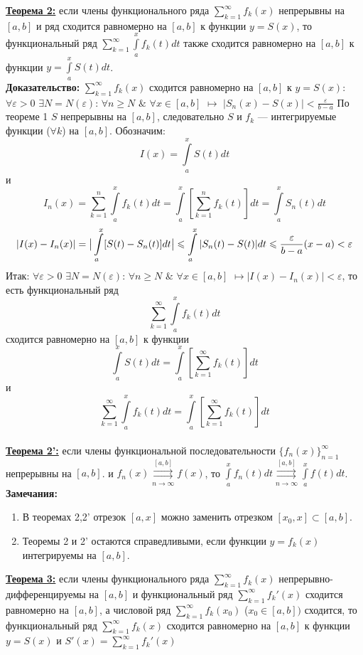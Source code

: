 \documentclass[a4paper,12pt]{article} %
\renewcommand {\geq}{\geqslant}
\renewcommand {\leq}{\leqslant}
\begin{document}
\underline{\textbf{Теорема 2:}} если члены функционального ряда $\sum\limits_{k = 1}^{\infty}  f_k(x)$   непрерывны на $[a,b]$ и ряд сходится равномерно на $[a,b]$ к функции $y = S(x)$, то функциональный ряд $\sum\limits_{k = 1}^{\infty}  \int\limits_{a}^{x}f_k(t)dt$ также сходится равномерно на $[a,b]$ к функции $y = \int\limits_{a}^{x}S(t)dt $.\\
\textbf{Доказательство:}
$\sum\limits_{k = 1}^{\infty}  f_k(x)$  сходится равномерно на $[a,b]$ к $y = S(x)$:
$\forall \varepsilon > 0$  $\exists N = N(\varepsilon)$: $\forall n \geqslant N$ $\& $ $\forall x \in [a,b]$ $\longmapsto$ $|S_n(x)-S(x)| < \frac{\varepsilon}{b - a}$
По теореме 1 $S$ непрерывны на $[a,b]$, следовательно $S$ и $f_k $ --- интегрируемые функции ($\forall k$) на $[a,b]$. Обозначим:
$$I(x) = \int\limits_{a}^{x}S(t)dt$$ и $$I_{n}(x) = \sum\limits_{k = 1}^{n}  \int\limits_{a}^{x}f_k(t)dt = \int\limits_{a}^{x}[ \sum\limits_{k = 1}^{n}  f_k(t) ]dt = \int\limits_{a}^x S_n(t)dt$$
$$|I(x)-I_n(x)| = \big|\int\limits_{a}^x[S(t)-S_n(t)]dt\big| \leq \int\limits_{a}^x|S_n(t)-S(t)|dt \leq {\varepsilon \over {b-a}} (x-a) < \varepsilon$$
Итак: 
$\forall \varepsilon > 0 $ $\exists N=N(\varepsilon)$: $\forall n \geq N$  $\&$ $\forall x \in [a,b]$ $\longmapsto |I(x)-I_n(x)| < \varepsilon$, то есть функциональный ряд $$\sum\limits_{k = 1}^{\infty} \int\limits_{a}^{x}f_k(t)dt$$ сходится равномерно на $[a,b]$ к функции $$\int\limits_a^xS(t)dt = \int\limits_{a}^{x}[ \sum\limits_{k = 1}^{\infty}  f_k(t) ]dt$$ и $$\sum\limits_{k = 1}^{\infty}  \int\limits_{a}^{x}f_k(t)dt = \int\limits_{a}^{x}[ \sum\limits_{k = 1}^{\infty}  f_k(t) ]dt$$\\
\underline{\textbf{Теорема 2':}} если члены функциональной последовательности  $\{f_n(x)\}_{n=1}^\infty$ непрерывны на $[a,b]$. и $f_n(x) \overset{[a,b]}{\underset{n \rightarrow \infty}{\rightrightarrows}} f(x)$, то $\int\limits_a^x f_n(t)dt \overset{[a,b]}{\underset{n \rightarrow \infty}{\rightrightarrows}} \int\limits_a^x f(t)dt$.\\
\textbf{Замечания:}
\begin{enumerate}
\item В теоремах 2,2' отрезок $[a,x]$ можно заменить отрезком $[x_0,x] \subset [a,b].$

\item Теоремы 2 и 2' остаются справедливыми, если функции $y=f_k(x)$ интегрируемы на $[a,b]$.
\end{enumerate}
\underline{\textbf{Теорема 3:}} если члены функционального ряда $\sum\limits_{k = 1}^{\infty}  f_k(x)$   непрерывно-дифференцируемы  на $[a,b]$ и функциональный ряд $\sum\limits_{k = 1}^{\infty}  f_k'(x)$ сходится равномерно на $[a,b]$, а числовой ряд $\sum\limits_{k = 1}^{\infty}  f_k(x_0)$ ($x_0 \in [a,b])$ сходится, то функциональный ряд $\sum\limits_{k = 1}^{\infty}  f_k(x)$ сходится равномерно на $[a,b]$ к функции $y = S(x)$ и $S'(x) = \sum\limits_{k = 1}^{\infty}  f_k'(x)$
\end{document}
